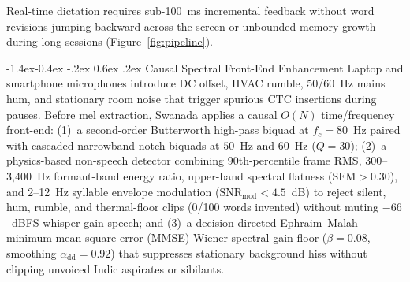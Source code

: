 \documentclass[10pt,twocolumn]{article}
\makeatletter
\renewcommand\subsection{\@startsection{subsection}{2}{\z@}%
  {-1.4ex\@plus -0.4ex \@minus -.2ex}%
  {0.6ex \@plus .2ex}%
  {\normalfont\normalsize\bfseries}}
\makeatother
\begin{document}
Real-time dictation requires sub-100~ms incremental feedback without word revisions jumping backward across the screen or unbounded memory growth during long sessions (Figure~\ref{fig:pipeline}).

\subsection{Causal Spectral Front-End Enhancement}
Laptop and smartphone microphones introduce DC offset, HVAC rumble, 50/60~Hz mains hum, and stationary room noise that trigger spurious CTC insertions during pauses. Before mel extraction, Swanada applies a causal $O(N)$ time/frequency front-end: (1)~a second-order Butterworth high-pass biquad at $f_c = 80$~Hz paired with cascaded narrowband notch biquads at $50$~Hz and $60$~Hz ($Q = 30$); (2)~a physics-based non-speech detector combining 90th-percentile frame RMS, 300--3,400~Hz formant-band energy ratio, upper-band spectral flatness ($\text{SFM} > 0.30$), and 2--12~Hz syllable envelope modulation ($\text{SNR}_{\text{mod}} < 4.5$~dB) to reject silent, hum, rumble, and thermal-floor clips (0/100 words invented) without muting $-66$~dBFS whisper-gain speech; and (3)~a decision-directed Ephraim--Malah~\cite{ephraim1984speech} minimum mean-square error (MMSE) Wiener spectral gain floor ($\beta = 0.08$, smoothing $\alpha_{\text{dd}} = 0.92$) that suppresses stationary background hiss without clipping unvoiced Indic aspirates or sibilants.
\end{document}
